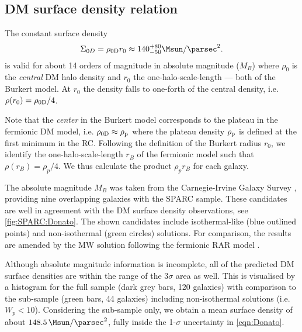 \subsection{DM surface density relation}
\label{sec:dark-matter-surface-density}

The constant surface density \citep{2009MNRAS.397.1169D} 
%
\begin{equation}
\label{eqn:Donato}
	\Sigma_{0D} = \rho_{\rm 0D} r_0 \approx 140_{-50}^{+80} \si{\Msun\per\parsec^2}.
\end{equation} 
%
is valid for about 14 orders of magnitude in absolute magnitude ($M_B$) where $\rho_0$ is the \textit{central} DM halo density and $r_0$ the one-halo-scale-length --- both of the Burkert model. At $r_0$ the density falls to one-forth of the central density, i.e. $\rho(r_0) = \rho_{\rm 0D}/4$.

Note that the \textit{center} in the Burkert model corresponds to the plateau in the fermionic DM model, i.e. $\rho_{\rm 0D} \approx \rho_{\rm p}$ where the plateau density $\rho_{\rm p}$ is defined at the first minimum in the RC. Following the definition of the Burkert radius $r_0$, we identify the one-halo-scale-length $r_B$ of the fermionic model such that $\rho(r_B) = \rho_p/4$. We thus calculate the product $\rho_p r_B$ for each galaxy.

The absolute magnitude $M_B$ was taken from the Carnegie-Irvine Galaxy Survey \citep{2011ApJS..197...21H}, providing nine overlapping galaxies with the SPARC sample. These candidates are well in agreement with the DM surface density observations, see \cref{fig:SPARC:Donato}. The shown candidates include isothermal-like (blue outlined points) and non-isothermal (green circles) solutions. For comparison, the results are amended by the MW solution following the fermionic RAR model \citep{2018PDU....21...82A}.


Although absolute magnitude information is incomplete, all of the predicted DM surface densities are within the range of the $3\sigma$ area as well. This is visualised by a histogram for the full sample (dark grey bars, 120 galaxies) with comparison to the sub-sample (green bars, 44 galaxies) including non-isothermal solutions (i.e. $W_p < 10$). Considering the sub-sample only, we obtain a mean surface density of about $\SI{148.5}{\Msun/\parsec^2}$, fully inside the 1-$\sigma$ uncertainty in \cref{eqn:Donato}.

